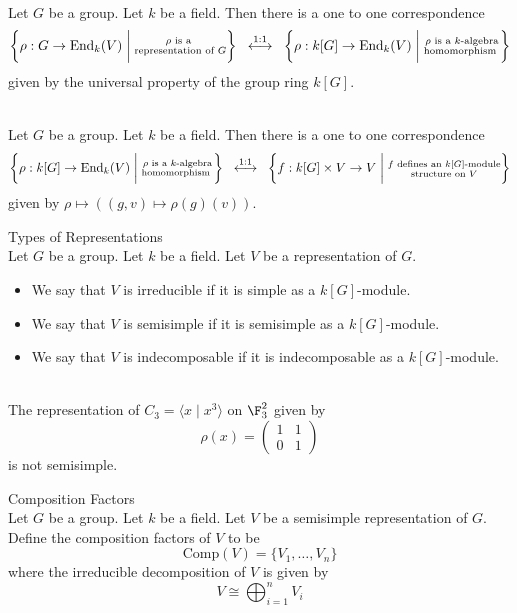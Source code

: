 \documentclass[a4paper]{article}
\begin{document}
\begin{lmm}{}{}\\
Let $G$ be a group. Let $k$ be a field. Then there is a one to one correspondence $$\left\{\rho:G\to\text{End}_k(V)\;\bigg{|}\;\substack{\rho\text{ is a }\\\text{representation of }G}\right\}\;\;\overset{1:1}{\longleftrightarrow}\;\;\left\{\rho:k[G]\to\text{End}_k(V)\;\bigg{|}\;\substack{\rho\text{ is a }k\text{-algebra}\\\text{homomorphism }}\right\}$$ given by the universal property of the group ring $k[G]$. 
\end{lmm}

\begin{lmm}{}{}\\
Let $G$ be a group. Let $k$ be a field. Then there is a one to one correspondence $$\left\{\rho:k[G]\to\text{End}_k(V)\;\bigg{|}\;\substack{\rho\text{ is a }k\text{-algebra}\\\text{homomorphism }}\right\}\;\;\overset{1:1}{\longleftrightarrow}\;\;\left\{f:k[G]\times V\to V\;\bigg{|}\;\substack{f\text{ defines an }k[G]\text{-module}\\\text{structure on }V}\right\}$$ given by $\rho\mapsto((g,v)\mapsto\rho(g)(v))$. 
\end{lmm}

\begin{defn}{Types of Representations}{}\\
Let $G$ be a group. Let $k$ be a field. Let $V$ be a representation of $G$. 
\begin{itemize}
\item We say that $V$ is irreducible if it is simple as a $k[G]$-module. 
\item We say that $V$ is semisimple if it is semisimple as a $k[G]$-module. 
\item We say that $V$ is indecomposable if it is indecomposable as a $k[G]$-module. 
\end{itemize}
\end{defn}

\begin{eg}{}{}\\
The representation of $C_3=\langle x\;|\;x^3\rangle$ on $\F_3^2$ given by $$\rho(x)=\begin{pmatrix}
1 & 1\\
0 & 1
\end{pmatrix}$$ is not semisimple.
\end{eg}

\begin{defn}{Composition Factors}{}\\
Let $G$ be a group. Let $k$ be a field. Let $V$ be a semisimple representation of $G$. Define the composition factors of $V$ to be $$\text{Comp}(V)=\{V_1,\dots,V_n\}$$ where the irreducible decomposition of $V$ is given by $$V\cong\bigoplus_{i=1}^nV_i$$
\end{defn}
\end{document}
